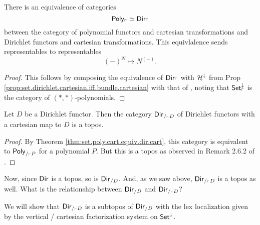\begin{thm}\label{thm:set.poly.cart.equiv.dir.cart}
  There is an equivalence of categories
  $$\mathsf{{Poly}}_{\ulcorner} \simeq \operatorname{\mathsf{{Dir}}}_{\ulcorner}$$
  between the category of polynomial functors and cartesian transformations and
  Dirichlet functors and cartesian transformations. This equivlalence sends
  representables to representables
  $$(-)^N \mapsto N^{(-)}.$$
\end{thm}
\begin{proof}
This follows by composing the equivalence of $\operatorname{\mathsf{{Dir}}}_{\ulcorner}$ with
$\operatorname{\mathcal{H}}^{\mathbin{\downarrow}}$ from Prop
\ref{prop:set.dirichlet.cartesian.iff.bundle.cartesian} with that of
\cite[Proposition 3.14]{GambinoKock}, noting that
$\operatorname{\mathsf{{Set}}}^{\mathbin{\downarrow}}_{\ulcorner}$ is the category of $(\ast,\ast)$-polynomials. 
\end{proof}

\begin{cor}
  Let $D$ be a Dirichlet functor. Then the category
  $\operatorname{\mathsf{{Dir}}}_{/_{\ulcorner} D}$
  of Dirichlet functors with a cartesian map to $D$ is a topos.
\end{cor}
\begin{proof}
By Theorem \ref{thm:set.poly.cart.equiv.dir.cart}, this category is equivalent
to $\mathsf{{Poly}}_{/_{\ulcorner} P}$ for a polynomial $P$. But this is a topos as
observed in Remark 2.6.2 of \cite{GHK:Analytic.Monads}.
\end{proof}

Now, since $\operatorname{\mathsf{{Dir}}}$ is a topos, so is $\operatorname{\mathsf{{Dir}}}_{/D}$. And, as we saw above,
$\operatorname{\mathsf{{Dir}}}_{/_{\ulcorner} D}$ is a topos as well. What is the relationship between
$\operatorname{\mathsf{{Dir}}}_{/D}$ and $\operatorname{\mathsf{{Dir}}}_{/_{\ulcorner} D}$?

We will show that $\operatorname{\mathsf{{Dir}}}_{/_{\ulcorner} D}$ is a subtopos of $\operatorname{\mathsf{{Dir}}}_{/D}$ with the
lex localization given by the vertical / cartesian factorization system on $\operatorname{\mathsf{{Set}}}^{\mathbin{\downarrow}}$.

